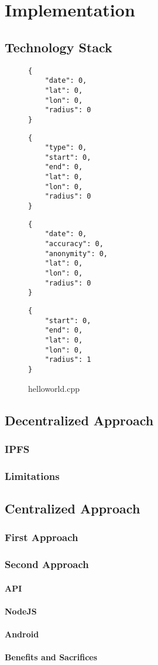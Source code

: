 
\chapter{Implementation}\label{chapter:implementation}
\section{Technology Stack}

\begin{figure}[h]
\begin{multicols}{4}
\begin{lstlisting}
{
	"date": 0,
	"lat": 0,
	"lon": 0,
	"radius": 0
}
\end{lstlisting}
\columnbreak
\begin{lstlisting}
{
	"type": 0,
	"start": 0,
	"end": 0,
	"lat": 0,
	"lon": 0,
	"radius": 0
}
\end{lstlisting}
\columnbreak
\begin{lstlisting}
{
	"date": 0,
	"accuracy": 0,
	"anonymity": 0,
	"lat": 0,
	"lon": 0,
	"radius": 0
}
\end{lstlisting}
\columnbreak
\begin{lstlisting}
{
	"start": 0,
	"end": 0,
	"lat": 0,
	"lon": 0,
	"radius": 1
}
\end{lstlisting}
\end{multicols}
\caption{helloworld.cpp}
\end{figure}

\section{Decentralized Approach}

\subsection{IPFS}
\subsection{Limitations}
\section{Centralized Approach}
\subsection{First Approach}
\subsection{Second Approach}
\subsubsection{API}
\subsubsection{NodeJS}
\subsubsection{Android}
\subsubsection{Benefits and Sacrifices}